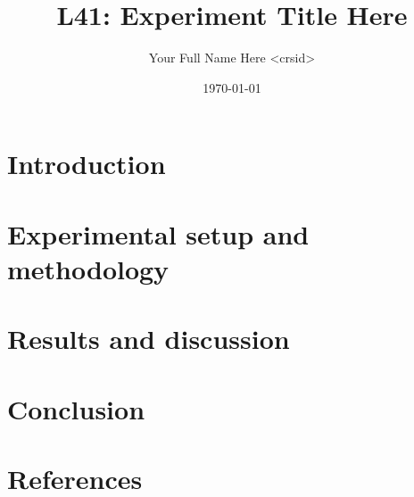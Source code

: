 \documentclass[a4paper,10pt]{article}
\begin{document}
\title{L41: Experiment Title Here}
\author{Your Full Name Here \textless{}crsid\textgreater{}}
\date{\today}

\maketitle

\thispagestyle{empty}

\begin{abstract}
\end{abstract}

\clearpage

\setcounter{page}{1}

\section{Introduction}

\section{Experimental setup and methodology}

\section{Results and discussion}

\section{Conclusion}

\section{References}

\end{document}
